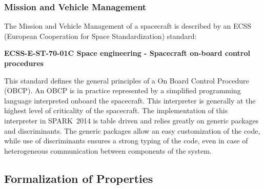 \documentclass[10pt,a4paper,twocolumn]{article}
\newcommand{\newspark}{SPARK~2014\xspace}
\begin{document}
\subsubsection{Mission and Vehicle Management}

The Mission and Vehicle Management of a spacecraft is described by an ECSS (European Cooperation for Space Standardization) standard:

\begin{center}
{\bf ECSS-E-ST-70-01C Space engineering - Spacecraft on-board control procedures}
\end{center}

This standard defines the general principles of a On Board Control Procedure
(OBCP). An OBCP is in practice represented by a simplified programming language
interpreted onboard the spacecraft. This interpreter is generally at the
highest level of criticality of the spacecraft. The implementation of this
interpreter in \newspark is table driven and relies greatly on generic packages
and discriminants. The generic packages allow an easy customization of the
code, while use of discriminants ensures a strong typing of the code, even in
case of heterogeneous communication between components of the system.









\subsection{Formalization of Properties}
\end{document}
